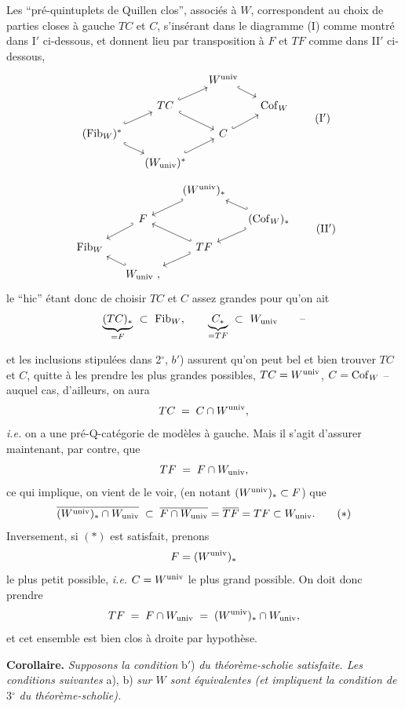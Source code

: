 Les “pré-quintuplets de Quillen clos”, associés à $W$, correspondent au choix de parties closes à gauche $TC$ et $C$, s'insérant dans le diagramme (I) comme montré dans I$'$ ci-dessous, et donnent lieu par transposition à $F$ et $TF$ comme dans II$'$ ci-dessous,
\[
\begin{tikzcd}[column sep=small, row sep=small]
 & & W^{\univ} \arrow[dr, hook] & \\
 & TC \arrow[ur, hook] \arrow[dr, hook] & & \Cof_W \\
(\Fib_W)^* \arrow[ur, hook] \arrow[dr, hook] & & C \arrow[ur, hook] & \\
 & (W_{\univ})^* \arrow[ur, hook] & &
\end{tikzcd}
\tag*{(I$'$)}
\]
\[
\begin{tikzcd}[column sep=small, row sep=small]
 & & (W^{\univ})_* \arrow[dl, hook'] & \\
 & F \arrow[dl, hook'] & & (\Cof_W)_* \arrow[ul, hook'] \arrow[dl, hook'] \\
\Fib_W & & TF \arrow[ul, hook'] \arrow[dl, hook'] & \\
 & W_{\univ}\ , \arrow[ul, hook'] & &
\end{tikzcd}
\tag*{(II$'$)}
\]
le “hic” étant donc de choisir $TC$ et $C$ assez grandes pour qu'on ait
\[ \underbrace{(TC)_*}_{= F} \ \subset\ \mathrm{Fib}_W, \qquad \underbrace{C_*}_{= TF} \ \subset\ W_{\mathrm{univ}} \qquad \text{--} \]


\noindent et les inclusions stipulées dans 2$^\circ$, $b'$) assurent qu'on peut bel et bien trouver $TC$ et $C$, quitte à les prendre les plus grandes possibles, $TC = W^{\mathrm{univ}}$, $C = \mathrm{Cof}_W$ -- auquel cas, d'ailleurs, on aura
\[
TC \;=\; C \cap W^{\mathrm{univ}},
\]
\textit{i.e.} on a une pré-Q-catégorie de modèles à gauche. Mais il s'agit d'assurer maintenant, par contre, que
\[
TF \;=\; F \cap W_{\mathrm{univ}},
\]
ce qui implique, on vient de le voir, (en notant $(W^{\mathrm{univ}})_* \subset F$) que
\[
\overline{(W^{\univ})_* \cap W_{\univ}} \;\subset\; \overline{F \cap W_{\univ}} = \overline{TF} = TF \subset W_{\univ}. \tag*{$(*)$}
\]
Inversement, si $(*)$ est satisfait, prenons
\[
F = (W^{\mathrm{univ}})_*
\]
le plus petit possible, \textit{i.e.} $C = W^{\mathrm{univ}}$ le plus grand possible. On doit donc prendre
\[
TF \;=\; F \cap W_{\mathrm{univ}} \;=\; (W^{\mathrm{univ}})_* \cap W_{\mathrm{univ}},
\]
et cet ensemble est bien clos à droite par hypothèse.

\textbf{Corollaire.} \textit{Supposons la condition} b$'$) \textit{du théorème-scholie satisfaite. Les conditions suivantes} a), b) \textit{sur $W$ sont équivalentes (et impliquent la condition de} 3$^\circ$ \textit{du théorème-scholie).}

